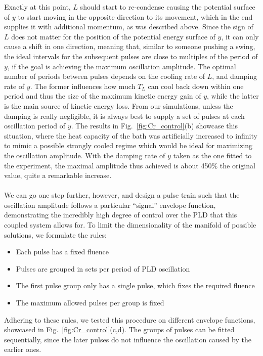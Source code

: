 Exactly at this point, $L$ should start to re-condense causing the potential surface of $y$ to start moving in the opposite direction to its movement, which in the end supplies it with additional momentum, as was described above.
Since the sign of $L$ does not matter for the position of the potential energy surface of $y$, it can only cause a shift in one direction, meaning that, similar to someone pushing a swing, the ideal intervals for the subsequent pulses are close to multiples of the period of $y$, if the goal is achieving the maximum oscillation amplitude.
The optimal number of periods between pulses depends on the cooling rate of $L$, and damping rate of $y$.
The former influences how much $T_L$ can cool back down within one period and thus the size of the maximum kinetic energy gain of $y$, while the latter is the main source of kinetic energy loss. From our simulations, unless the damping is really negligible, it is always best to supply a set of pulses at each oscillation period of $y$.
The results in Fig.~\ref{fig:Cr_control}(b) showcase this situation, where the heat capacity of the bath was artificially increased to infinity to mimic a possible strongly cooled regime which would be ideal for maximizing the oscillation amplitude.
With the damping rate of $y$ taken as the one fitted to the experiment, the maximal amplitude thus achieved is about 450\% the original value, quite a remarkable increase.  
\\\\
We can go one step further, however, and design a pulse train such that the oscillation amplitude follows a particular ``signal'' envelope function, demonstrating the incredibly high degree of control over the PLD that this coupled system allows for.  
To limit the dimensionality of the manifold of possible solutions, we formulate the rules:
\begin{itemize}
	\item Each pulse has a fixed fluence
	\item Pulses are grouped in sets per period of PLD oscillation
	\item The first pulse group only has a single pulse, which fixes the required fluence
	\item The maximum allowed pulses per group is fixed
\end{itemize}
Adhering to these rules, we tested this procedure on different envelope functions, showcased in Fig.~\ref{fig:Cr_control}(c,d).
The groups of pulses can be fitted sequentially, since the later pulses do not influence the oscillation caused by the earlier ones.
